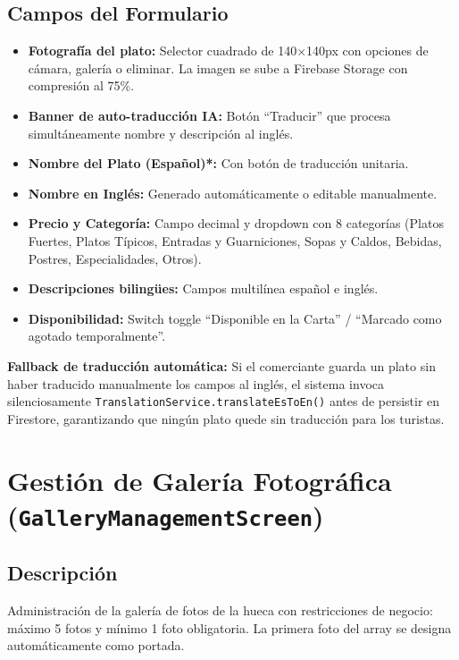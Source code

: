 \documentclass[11pt, a4paper, oneside]{report}
\begin{document}
\subsection{Campos del Formulario}
\begin{itemize}
  \item \textbf{Fotografía del plato:} Selector cuadrado de 140$\times$140px con opciones de cámara, galería o eliminar. La imagen se sube a Firebase Storage con compresión al 75\%.
  \item \textbf{Banner de auto-traducción IA:} Botón ``Traducir'' que procesa simultáneamente nombre y descripción al inglés.
  \item \textbf{Nombre del Plato (Español)*:} Con botón de traducción unitaria.
  \item \textbf{Nombre en Inglés:} Generado automáticamente o editable manualmente.
  \item \textbf{Precio y Categoría:} Campo decimal y dropdown con 8 categorías (Platos Fuertes, Platos Típicos, Entradas y Guarniciones, Sopas y Caldos, Bebidas, Postres, Especialidades, Otros).
  \item \textbf{Descripciones bilingües:} Campos multilínea español e inglés.
  \item \textbf{Disponibilidad:} Switch toggle ``Disponible en la Carta'' / ``Marcado como agotado temporalmente''.
\end{itemize}

\begin{techbox}
\textbf{Fallback de traducción automática:} Si el comerciante guarda un plato sin haber traducido manualmente los campos al inglés, el sistema invoca silenciosamente \texttt{TranslationService.translateEsToEn()} antes de persistir en Firestore, garantizando que ningún plato quede sin traducción para los turistas.
\end{techbox}

\section{Gestión de Galería Fotográfica (\texttt{GalleryManagementScreen})}

\subsection{Descripción}
Administración de la galería de fotos de la hueca con restricciones de negocio: máximo 5 fotos y mínimo 1 foto obligatoria. La primera foto del array se designa automáticamente como portada.
\end{document}
